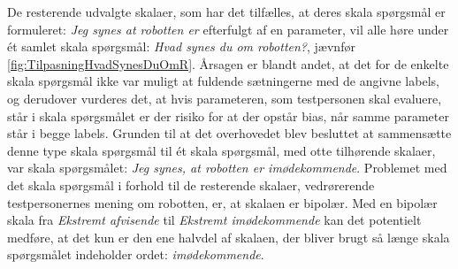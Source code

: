 \noindent
%  
De resterende udvalgte skalaer, som har det tilfælles, at deres skala spørgsmål er formuleret: \textit{Jeg synes at robotten er} efterfulgt af en parameter, vil alle høre under ét samlet skala spørgsmål: \textit{Hvad synes du om robotten?}, jævnfør \autoref{fig:TilpasningHvadSynesDuOmR}. Årsagen er blandt andet, at det for de enkelte skala spørgsmål ikke var muligt at fuldende sætningerne med de angivne labels, og derudover vurderes det, at hvis parameteren, som testpersonen skal evaluere, står i skala spørgsmålet er der risiko for at der opstår bias, når samme parameter står i begge labels. Grunden til at det overhovedet blev besluttet at sammensætte denne type skala spørgsmål til ét skala spørgsmål, med otte tilhørende skalaer, var skala spørgsmålet: \textit{Jeg synes, at robotten er imødekommende}. Problemet med det skala spørgsmål i forhold til de resterende skalaer, vedrørerende testpersonernes mening om robotten, er, at skalaen er bipolær. Med en bipolær skala fra \textit{Ekstremt afvisende} til \textit{Ekstremt imødekommende} kan det potentielt medføre, at det kun er den ene halvdel af skalaen, der bliver brugt så længe skala spørgsmålet indeholder ordet: \textit{imødekommende}. 

